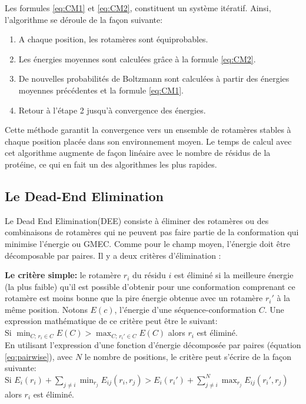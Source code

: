 Les formules \ref{eq:CM1} et \ref{eq:CM2}, constituent un système itératif. Ainsi, l'algorithme se déroule de la façon suivante:
\begin{enumerate}[leftmargin=*]
\item  A chaque position, les rotamères sont équiprobables.
\item  Les énergies moyennes sont calculées grâce à la formule \ref{eq:CM2}.
\item  De nouvelles probabilités de Boltzmann sont calculées à partir des énergies moyennes précédentes et la formule \ref{eq:CM1}.
\item  Retour à l'étape 2 jusqu'à convergence des énergies.
\end{enumerate}
Cette méthode garantit la convergence vers un ensemble de rotamères stables à chaque position placée dans son \og environnement moyen\fg . Le temps de calcul avec cet algorithme augmente  de façon linéaire avec le nombre de résidus de la protéine, ce qui en fait un des algorithmes les plus rapides.

\subsection{Le Dead-End Elimination}
Le \og Dead End Elimination\fg (DEE)  consiste à éliminer des rotamères ou des combinaisons de rotamères qui ne peuvent pas faire partie de la conformation qui minimise l'énergie ou GMEC. Comme pour le champ moyen, l'énergie doit être décomposable par paires. Il y a deux critères d'élimination \cite{Desmet92}:

\textbf{Le critère simple:} le rotamère $r_i$ du résidu $i$ est éliminé si la meilleure énergie (la plus faible) qu'il est possible d'obtenir pour une conformation comprenant ce rotamère est moins bonne que la pire énergie obtenue avec un rotamère $r_i'$  à la même position. Notons $E(c)$, l'énergie d'une séquence-conformation $C$. Une expression mathématique de ce critère peut être le suivant:\\
Si $\displaystyle \min_{C;\,r_i \in C }E(C) > \max_{C;\, r_i' \in C} E(C)$ alors $r_i$ est éliminé. \\
En utilisant l'expression d'une fonction d'énergie décomposée par paires (équation \ref{eq:pairwise}), avec $N$ le nombre de positions, le critère peut s'écrire de la façon suivante:\\
Si $\displaystyle E_i(r_i) + \sum_{j\neq i} \min_{r_j} E_{ij}(r_i,r_j) > E_i(r_i') + \sum_{j\neq i}^{N} \max_{r_j}E_{ij}(r_i',r_j)$ alors $r_i$ est éliminé.\\ 

